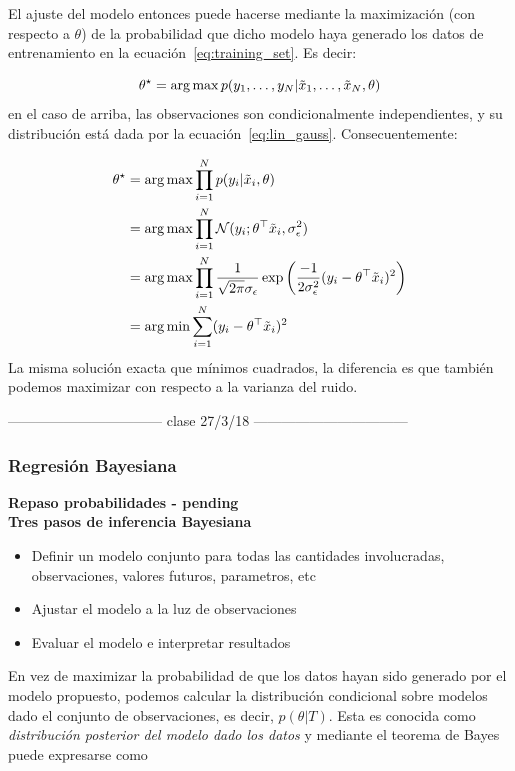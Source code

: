 El ajuste del modelo entonces puede hacerse mediante la maximización (con respecto a $\theta$) de la probabilidad que dicho modelo haya generado los datos de entrenamiento en la ecuación~\eqref{eq:training_set}. Es decir: 

\begin{equation}
	\theta^\star = \operatorname*{arg\,max} p(y_1,\ldots,y_N|\tilde{x}_1,\ldots,\tilde{x}_N,\theta)
\end{equation}
en el caso de arriba, las observaciones son condicionalmente independientes, y su distribución está dada por la ecuación~\eqref{eq:lin_gauss}. Consecuentemente:

\begin{align}
	\theta^\star 	&= \operatorname*{arg\,max} \prod_{i=1}^Np(y_i|\tilde{x}_i,\theta)\\
					&= \operatorname*{arg\,max} \prod_{i=1}^N {\mathcal N}(y_i;\theta^\top\tilde{x}_i,\sigma_\epsilon^2) \\
					&= \operatorname*{arg\,max} \prod_{i=1}^N \frac{1}{\sqrt{2\pi}\sigma_\epsilon} \exp\left({\frac{-1}{2\sigma_\epsilon^2}(y_i-\theta^\top\tilde{x}_i)^2}\right) \\
					&= \operatorname*{arg\,min} \sum_{i=1}^N (y_i-\theta^\top\tilde{x}_i)^2
\end{align}
La misma solución exacta que mínimos cuadrados, la diferencia es que también podemos maximizar con respecto a la varianza del ruido.


\centerline{--------------------------------- clase 27/3/18 ---------------------------------}

\subsubsection{Regresión Bayesiana} %
\label{ssub:map}
\noindent\textbf{Repaso probabilidades - pending}\\

\noindent\textbf{Tres pasos de inferencia Bayesiana}
\begin{itemize}
	\item Definir un modelo conjunto para todas las cantidades involucradas, observaciones, valores futuros, parametros, etc
	\item Ajustar el modelo a la luz de observaciones
	\item Evaluar el modelo e interpretar resultados
\end{itemize}




En vez de maximizar la probabilidad de que los datos hayan sido generado por el modelo propuesto, podemos calcular la distribución condicional sobre modelos dado el conjunto de observaciones, es decir, $p(\theta|T)$. Esta es conocida como \emph{distribución posterior del modelo dado los datos} y mediante el teorema de Bayes puede expresarse como


